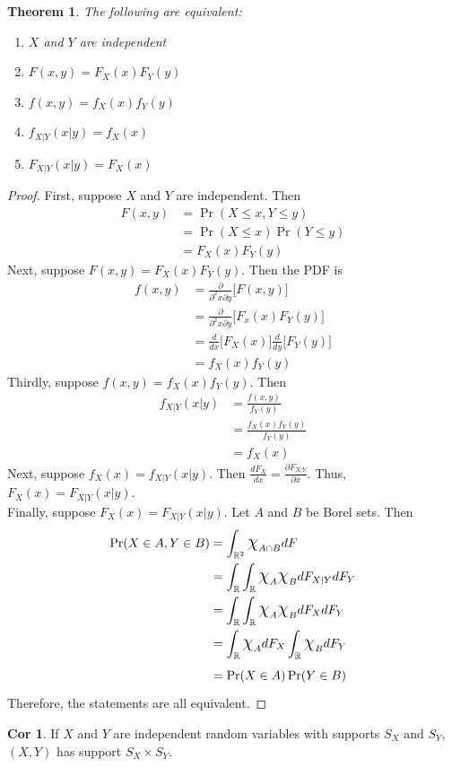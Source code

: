 \documentclass{article}
\newtheorem{theorem}{Theorem}
\theoremstyle{definition}\newtheorem{definition}{DEF}
\theoremstyle{lemma}\newtheorem{lemma}{Lemma}
\theoremstyle{corrolary}\newtheorem{corrolary}{Cor}
\begin{document}
\begin{theorem}
The following are equivalent:
\begin{enumerate}
\item $X$ and $Y$ are independent
\item $F(x,y)=F_X(x)F_Y(y)$
\item $f(x,y)=f_X(x)f_Y(y)$
\item $f_{X|Y}(x|y)=f_X(x)$
\item $F_{X|Y}(x|y)=F_X(x)$
\end{enumerate}
\end{theorem}
\begin{proof}
First, suppose $X$ and $Y$ are independent.
Then
\begin{align*}
F(x,y) &= \Pr(X\leq x, Y\leq y)\\
&= \Pr(X\leq x)\Pr(Y\leq y)\\
&=F_X(x)F_Y(y)
\end{align*}
Next, suppose $F(x,y)=F_X(x)F_Y(y)$.
Then the PDF is
\begin{align*}
f(x,y)&=\frac{\partial}{\partial^2 x\partial y}\bigg[F(x,y)\bigg]\\
&=\frac{\partial}{\partial^2 x\partial y}\bigg[ F_x(x)F_Y(y)\bigg]\\
&=\frac{d}{dx}\bigg[ F_X(x)\bigg] \frac{d}{dy}\bigg[ F_Y(y)\bigg]\\
&=f_X(x)f_Y(y)
\end{align*}
Thirdly, suppose $f(x,y)=f_X(x)f_Y(y)$.
Then
\begin{align*}
f_{X|Y}(x|y)&=\frac{f(x,y)}{f_Y(y)}\\
&=\frac{f_X(x)f_Y(y)}{f_Y(y)}\\
&=f_X(x)
\end{align*}
Next, suppose $f_X(x)=f_{X|Y}(x|y)$.
Then $\frac{dF_X}{dx}=\frac{\partial F_{X|Y}}{\partial x}$.
Thus, $F_X(x)=F_{X|Y}(x|y)$. \\
Finally, suppose $F_X(x)=F_{X|Y}(x|y)$.
Let $A$ and $B$ be Borel sets.
Then
\begin{align*}
\Pr(X\in A, Y\in B)&= \int_{\mathbb{R}^2} \mbox{\Large$\chi$}_{A\cap B} dF\\
&= \int_\mathbb{R}\int_\mathbb{R} \mbox{\Large$\chi$}_A\mbox{\Large$\chi$}_B dF_{X|Y} dF_Y\\
&= \int_\mathbb{R}\int_\mathbb{R} \mbox{\Large$\chi$}_A\mbox{\Large$\chi$}_B dF_X dF_Y\\
&= \int_\mathbb{R} \mbox{\Large$\chi$}_A dF_X \int_\mathbb{R} \mbox{\Large$\chi$}_B dF_Y\\
&= \Pr(X\in A)\Pr(Y\in B)
\end{align*}
Therefore, the statements are all equivalent.
\end{proof}
\begin{corrolary}
If $X$ and $Y$ are independent random variables with supports $S_X$ and $S_Y$, $(X,Y)$ has support $S_X \times S_Y$.
\end{corrolary}
\end{document}
